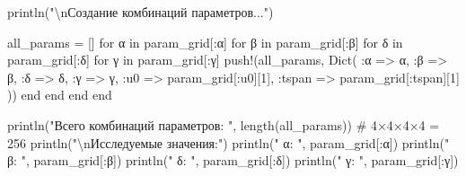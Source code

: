 \documentclass[
  12pt,
  a4paper,
  DIV=11,
  numbers=noendperiod]{scrreprt}
\newenvironment{Shaded}{\begin{snugshade}}{\end{snugshade}}
\newcommand{\CommentTok}[1]{\textcolor[rgb]{0.37,0.37,0.37}{#1}}
\newcommand{\ControlFlowTok}[1]{\textcolor[rgb]{0.00,0.23,0.31}{#1}}
\newcommand{\FloatTok}[1]{\textcolor[rgb]{0.68,0.00,0.00}{#1}}
\newcommand{\FunctionTok}[1]{\textcolor[rgb]{0.28,0.35,0.67}{#1}}
\newcommand{\KeywordTok}[1]{\textcolor[rgb]{0.00,0.23,0.31}{#1}}
\newcommand{\NormalTok}[1]{\textcolor[rgb]{0.00,0.23,0.31}{#1}}
\newcommand{\OperatorTok}[1]{\textcolor[rgb]{0.37,0.37,0.37}{#1}}
\newcommand{\SpecialCharTok}[1]{\textcolor[rgb]{0.37,0.37,0.37}{#1}}
\newcommand{\StringTok}[1]{\textcolor[rgb]{0.13,0.47,0.30}{#1}}
\begin{document}
\begin{Shaded}
\begin{Highlighting}[]
\FunctionTok{println}\NormalTok{(}\StringTok{"}\SpecialCharTok{\textbackslash{}n}\StringTok{Создание комбинаций параметров..."}\NormalTok{)}

\NormalTok{all\_params }\OperatorTok{=}\NormalTok{ []}
\ControlFlowTok{for}\NormalTok{ α }\KeywordTok{in}\NormalTok{ param\_grid[}\OperatorTok{:}\NormalTok{α]}
    \ControlFlowTok{for}\NormalTok{ β }\KeywordTok{in}\NormalTok{ param\_grid[}\OperatorTok{:}\NormalTok{β]}
        \ControlFlowTok{for}\NormalTok{ δ }\KeywordTok{in}\NormalTok{ param\_grid[}\OperatorTok{:}\NormalTok{δ]}
            \ControlFlowTok{for}\NormalTok{ γ }\KeywordTok{in}\NormalTok{ param\_grid[}\OperatorTok{:}\NormalTok{γ]}
                \FunctionTok{push!}\NormalTok{(all\_params, }\FunctionTok{Dict}\NormalTok{(}
                    \OperatorTok{:}\NormalTok{α }\OperatorTok{=\textgreater{}}\NormalTok{ α,}
                    \OperatorTok{:}\NormalTok{β }\OperatorTok{=\textgreater{}}\NormalTok{ β,}
                    \OperatorTok{:}\NormalTok{δ }\OperatorTok{=\textgreater{}}\NormalTok{ δ,}
                    \OperatorTok{:}\NormalTok{γ }\OperatorTok{=\textgreater{}}\NormalTok{ γ,}
                    \OperatorTok{:}\NormalTok{u0 }\OperatorTok{=\textgreater{}}\NormalTok{ param\_grid[}\OperatorTok{:}\NormalTok{u0][}\FloatTok{1}\NormalTok{],}
                    \OperatorTok{:}\NormalTok{tspan }\OperatorTok{=\textgreater{}}\NormalTok{ param\_grid[}\OperatorTok{:}\NormalTok{tspan][}\FloatTok{1}\NormalTok{]}
\NormalTok{                ))}
            \ControlFlowTok{end}
        \ControlFlowTok{end}
    \ControlFlowTok{end}
\ControlFlowTok{end}

\FunctionTok{println}\NormalTok{(}\StringTok{"Всего комбинаций параметров: "}\NormalTok{, }\FunctionTok{length}\NormalTok{(all\_params))  }\CommentTok{\# 4×4×4×4 = 256}
\FunctionTok{println}\NormalTok{(}\StringTok{"}\SpecialCharTok{\textbackslash{}n}\StringTok{Исследуемые значения:"}\NormalTok{)}
\FunctionTok{println}\NormalTok{(}\StringTok{"  α: "}\NormalTok{, param\_grid[}\OperatorTok{:}\NormalTok{α])}
\FunctionTok{println}\NormalTok{(}\StringTok{"  β: "}\NormalTok{, param\_grid[}\OperatorTok{:}\NormalTok{β])}
\FunctionTok{println}\NormalTok{(}\StringTok{"  δ: "}\NormalTok{, param\_grid[}\OperatorTok{:}\NormalTok{δ])}
\FunctionTok{println}\NormalTok{(}\StringTok{"  γ: "}\NormalTok{, param\_grid[}\OperatorTok{:}\NormalTok{γ])}
\end{Highlighting}
\end{Shaded}
\end{document}
